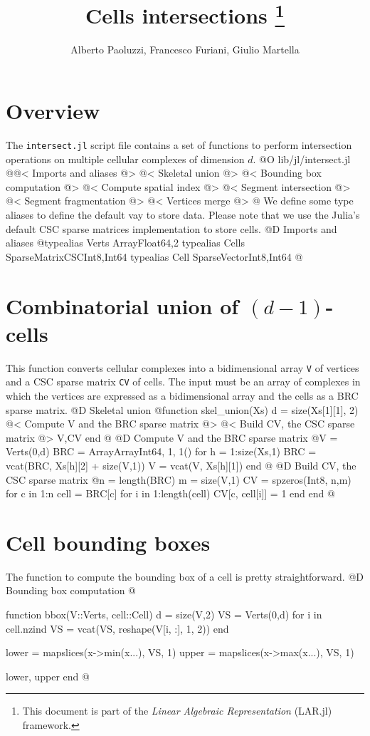 \documentclass[10pt,oneside]{article}
\author{Alberto Paoluzzi, Francesco Furiani, Giulio Martella}
\title{Cells intersections
\footnote{This document is part of the \emph{Linear Algebraic Representation} (LAR.jl) framework.}
}
\begin{document}
\maketitle
\newpage

\section{Overview}
The \texttt{intersect.jl} script file contains a set of functions to perform intersection
operations on multiple cellular complexes of dimension $d$.
@O lib/jl/intersect.jl
@{@< Imports and aliases @>
@< Skeletal union @>
@< Bounding box computation @>
@< Compute spatial index @>
@< Segment intersection @>
@< Segment fragmentation @>
@< Vertices merge @>
@}
We define some type aliases to define the default vay to store data.
Please note that we use the Julia's default CSC sparse matrices implementation
to store cells.
@D Imports and aliases
@{typealias Verts Array{Float64,2}
typealias Cells SparseMatrixCSC{Int8,Int64}
typealias Cell SparseVector{Int8,Int64}
@}

\section{Combinatorial union of $(d-1)$-cells}
This function converts cellular complexes into a bidimensional array \texttt{V} of 
vertices and a CSC sparse matrix \texttt{CV} of cells. The input must be an array of complexes
in which the vertices are expressed as a bidimensional array and the cells as a BRC
sparse matrix.
@D Skeletal union
@{function skel_union(Xs)
    d = size(Xs[1][1], 2)
    @< Compute V and the BRC sparse matrix @>
    @< Build CV, the CSC sparse matrix @>
    V,CV
end
@}
@D Compute V and the BRC sparse matrix
@{V = Verts(0,d)
BRC = Array{Array{Int64, 1}, 1}()
for h = 1:size(Xs,1)
    BRC = vcat(BRC, Xs[h][2] + size(V,1))
    V = vcat(V, Xs[h][1])
end
@}
@D Build CV, the CSC sparse matrix
@{n = length(BRC)
m = size(V,1)
CV = spzeros(Int8, n,m)
for c in 1:n
    cell = BRC[c]
    for i in 1:length(cell)
        CV[c, cell[i]] = 1
    end
end
@}


\section{Cell bounding boxes}
The function to compute the bounding box of a cell
is pretty straightforward.
@D Bounding box computation
@{function bbox(V::Verts, cell::Cell)
    d = size(V,2)
    VS = Verts(0,d)
    for i in cell.nzind
        VS = vcat(VS, reshape(V[i, :], 1, 2))
    end
    
    lower = mapslices(x->min(x...), VS, 1)
    upper = mapslices(x->max(x...), VS, 1)
    
    lower, upper
end
@}
\end{document}

